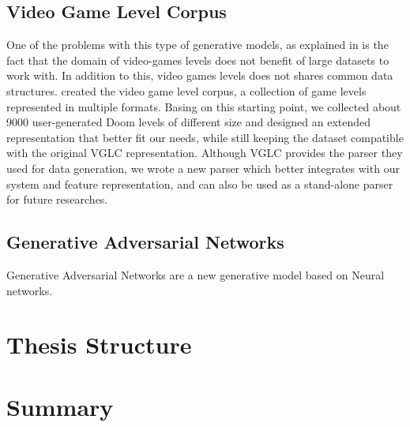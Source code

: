 \subsection{Video Game Level Corpus}
One of the problems with this type of generative models, as explained in \cite{PCGML} is the fact that the domain of video-games levels does not benefit of large datasets to work with. In addition to this, video games levels does not shares common data structures. \citeauthor{VGLC} created the video game level corpus, a collection of game levels represented in multiple formats. Basing on this starting point, we collected about 9000 user-generated Doom levels of different size and designed an extended representation that better fit our needs, while still keeping the dataset compatible with the original VGLC representation. Although VGLC provides the parser they used for data generation, we wrote a new parser which better integrates with our system and feature representation, and can also be used as a stand-alone parser for future researches.

\subsection{Generative Adversarial Networks}
Generative Adversarial Networks are a new generative model based on Neural networks. 


\section{Thesis Structure}
\section{Summary}
